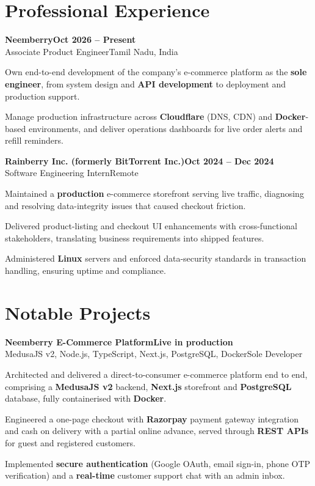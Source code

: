 \documentclass[10pt,a4paper]{article}
\newcommand{\entry}[2]{\textbf{#1}\hfill\textbf{#2}\\}
\newcommand{\sub}[2]{#1\hfill#2\par}
\newenvironment{points}{\vspace{0.3ex}\begin{list}{\color{theme}\textbullet}{\setlength{\leftmargin}{1.1em}\setlength{\itemsep}{0.15ex}\setlength{\parsep}{0pt}\setlength{\topsep}{0pt}}}{\end{list}\vspace{0.4ex}}
\begin{document}
\section{Professional Experience}
\entry{Neemberry}{Oct 2026 -- Present}
\sub{Associate Product Engineer}{Tamil Nadu, India}
\begin{points}
  \item Own end-to-end development of the company's e-commerce platform as the \textbf{sole engineer}, from system design and \textbf{API development} to deployment and production support.
  \item Manage production infrastructure across \textbf{Cloudflare} (DNS, CDN) and \textbf{Docker}-based environments, and deliver operations dashboards for live order alerts and refill reminders.
\end{points}

\entry{Rainberry Inc. (formerly BitTorrent Inc.)}{Oct 2024 -- Dec 2024}
\sub{Software Engineering Intern}{Remote}
\begin{points}
  \item Maintained a \textbf{production} e-commerce storefront serving live traffic, diagnosing and resolving data-integrity issues that caused checkout friction.
  \item Delivered product-listing and checkout UI enhancements with cross-functional stakeholders, translating business requirements into shipped features.
  \item Administered \textbf{Linux} servers and enforced data-security standards in transaction handling, ensuring uptime and compliance.
\end{points}

\section{Notable Projects}
\entry{Neemberry E-Commerce Platform}{Live in production}
\sub {MedusaJS v2, Node.js, TypeScript, Next.js, PostgreSQL, Docker}{Sole Developer}
\begin{points}
  \item Architected and delivered a direct-to-consumer e-commerce platform end to end, comprising a \textbf{MedusaJS v2} backend, \textbf{Next.js} storefront and \textbf{PostgreSQL} database, fully containerised with \textbf{Docker}.
  \item Engineered a one-page checkout with \textbf{Razorpay} payment gateway integration and cash on delivery with a partial online advance, served through \textbf{REST APIs} for guest and registered customers.
  \item Implemented \textbf{secure authentication} (Google OAuth, email sign-in, phone OTP verification) and a \textbf{real-time} customer support chat with an admin inbox.
\end{points}
\end{document}

